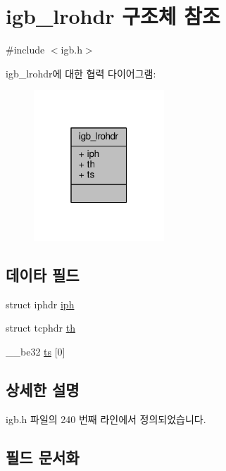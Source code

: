 \hypertarget{structigb__lrohdr}{}\section{igb\+\_\+lrohdr 구조체 참조}
\label{structigb__lrohdr}


{\ttfamily \#include $<$igb.\+h$>$}



igb\+\_\+lrohdr에 대한 협력 다이어그램\+:
\nopagebreak
\begin{figure}[H]
\begin{center}
\leavevmode
\includegraphics[width=139pt]{structigb__lrohdr__coll__graph}
\end{center}
\end{figure}
\subsection*{데이타 필드}
\begin{DoxyCompactItemize}
\item 
struct iphdr \hyperlink{structigb__lrohdr_aa0d3bc23d63a8f27af63f8ed43faceae}{iph}
\item 
struct tcphdr \hyperlink{structigb__lrohdr_a40799b2267bf3b2c39ee098a5c75a7aa}{th}
\item 
\+\_\+\+\_\+be32 \hyperlink{structigb__lrohdr_a886c506dce37671cf7fd216a7585674c}{ts} \mbox{[}0\mbox{]}
\end{DoxyCompactItemize}


\subsection{상세한 설명}


igb.\+h 파일의 240 번째 라인에서 정의되었습니다.



\subsection{필드 문서화}
